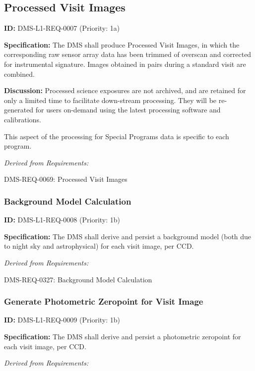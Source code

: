 \documentclass[SE,toc,lsstdraft]{lsstdoc}
\begin{document}
\subsection{Processed Visit Images}

\label{DMS-L1-REQ-0007}
\textbf{ID:} DMS-L1-REQ-0007 (Priority: 1a)

\textbf{Specification: }The DMS shall produce Processed Visit Images, in which the corresponding raw sensor array data has been trimmed of overscan and corrected for instrumental signature. Images obtained in pairs during a standard visit are combined.

\textbf{Discussion:} Processed science exposures are not archived, and are retained for only a limited time to facilitate down-stream processing. They will be re-generated for users on-demand using the latest processing software and calibrations.

This aspect of the processing for Special Programs data is specific to each program.

\emph{Derived from Requirements:}

DMS-REQ-0069:
Processed Visit Images \newline

\subsubsection{Background Model Calculation}

\label{DMS-L1-REQ-0008}
\textbf{ID:} DMS-L1-REQ-0008 (Priority: 1b)

\textbf{Specification: }The DMS shall derive and persist a background model (both due to night sky and astrophysical) for each visit image, per CCD.

\emph{Derived from Requirements:}

DMS-REQ-0327:
Background Model Calculation \newline

\subsubsection{Generate Photometric Zeropoint for Visit Image}

\label{DMS-L1-REQ-0009}
\textbf{ID:} DMS-L1-REQ-0009 (Priority: 1b)

\textbf{Specification:} The DMS shall derive and persist a photometric zeropoint for each visit image, per CCD.

\emph{Derived from Requirements:}
\end{document}
